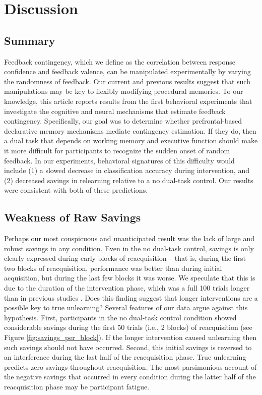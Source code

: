 \documentclass[man,apacite,draftfirst]{apa6}
\begin{document}
\section*{Discussion}
\subsection*{Summary}
Feedback contingency, which we define as the correlation between response
confidence and feedback valence, can be manipulated experimentally by varying
the randomness of feedback. Our current and previous results
\cite{crossley_erasing_2013} suggest that such manipulations may be key to
flexibly modifying procedural memories. To our knowledge, this article reports
results from the first behavioral experiments that investigate the cognitive and
neural mechanisms that estimate feedback contingency. Specifically, our goal was
to determine whether prefrontal-based declarative memory mechanisms mediate
contingency estimation. If they do, then a dual task that depends on working
memory and executive function should make it more difficult for participants to
recognize the sudden onset of random feedback. In our experiments, behavioral
signatures of this difficulty would include (1) a slowed decrease in
classification accuracy during intervention, and (2) decreased savings in
relearning relative to a no dual-task control. Our results were consistent with
both of these predictions.

\subsection*{Weakness of Raw Savings}
Perhaps our most conspicuous and unanticipated result was the lack of large and robust savings in any condition. Even in the no dual-task control, savings is only clearly expressed during early blocks of reacquisition -- that is, during the first two blocks of reacquisition, performance was better than during initial acquisition, but during the last few blocks it was worse. We speculate that this is due to the duration of the intervention phase, which was a full 100 trials longer than in previous studies \cite{crossley_erasing_2013, CrossleyAshbyMaddox2014}. Does this finding suggest that longer interventions are a possible key to true unlearning? Several features of our data argue against this hypothesis. First, participants in the no dual-task control condition showed considerable savings during the first 50 trials (i.e., 2 blocks) of reacquisition (see Figure \ref{fig:savings_per_block}). If the longer intervention caused unlearning then such savings should not have occurred. Second, this initial savings is reversed to an interference during the last half of the reacquisition phase. True unlearning predicts zero savings throughout reacquisition. The most parsimonious account of the negative savings that occurred in every condition during the latter half of the reacquisition phase may be participant fatigue.
\end{document}
